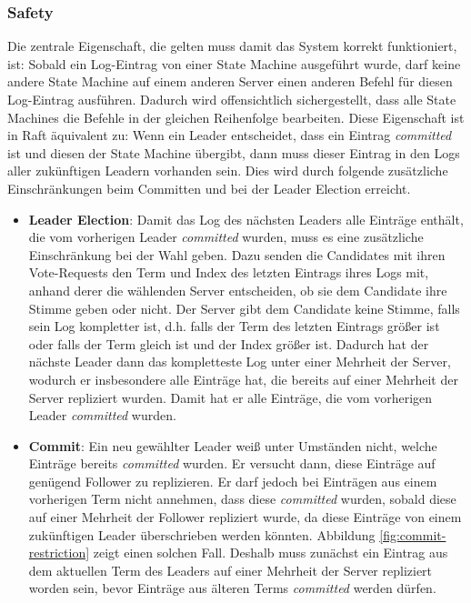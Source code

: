 \subsubsection{Safety}

Die zentrale Eigenschaft, die gelten muss damit das System korrekt funktioniert, ist: Sobald ein Log-Eintrag von einer State Machine ausgeführt wurde, darf keine andere State Machine auf einem anderen Server einen anderen Befehl für diesen Log-Eintrag ausführen. Dadurch wird offensichtlich sichergestellt, dass alle State Machines die Befehle in der gleichen Reihenfolge bearbeiten. Diese Eigenschaft ist in Raft äquivalent zu: Wenn ein Leader entscheidet, dass ein Eintrag \textit{committed} ist und diesen der State Machine übergibt, dann muss dieser Eintrag in den Logs aller zukünftigen Leadern vorhanden sein. Dies wird durch folgende zusätzliche Einschränkungen beim Committen und bei der Leader Election erreicht.

\begin{itemize}
	\item \textbf{Leader Election}: Damit das Log des nächsten Leaders alle Einträge enthält, die vom vorherigen Leader \textit{committed} wurden, muss es eine zusätzliche Einschränkung bei der Wahl geben. Dazu senden die Candidates mit ihren Vote-Requests den Term und Index des letzten Eintrags ihres Logs mit, anhand derer die wählenden Server entscheiden, ob sie dem Candidate ihre Stimme geben oder nicht. Der Server gibt dem Candidate keine Stimme, falls sein Log kompletter ist, d.h. falls der Term des letzten Eintrags größer ist oder falls der Term gleich ist und der Index größer ist. Dadurch hat der nächste Leader dann das \glqq{}kompletteste\grqq{} Log unter einer Mehrheit der Server, wodurch er insbesondere alle Einträge hat, die bereits auf einer Mehrheit der Server repliziert wurden. Damit hat er alle Einträge, die vom vorherigen Leader \textit{committed} wurden.
	\item \textbf{Commit}: Ein neu gewählter Leader weiß unter Umständen nicht, welche Einträge bereits \textit{committed} wurden. Er versucht dann, diese Einträge auf genügend Follower zu replizieren. Er darf jedoch bei Einträgen aus einem vorherigen Term nicht annehmen, dass diese \textit{committed} wurden, sobald diese auf einer Mehrheit der Follower repliziert wurde, da diese Einträge von einem zukünftigen Leader überschrieben werden könnten. Abbildung \ref{fig:commit-restriction} zeigt einen solchen Fall. Deshalb muss zunächst ein Eintrag aus dem aktuellen Term des Leaders auf einer Mehrheit der Server repliziert worden sein, bevor Einträge aus älteren Terms \textit{committed} werden dürfen.
\end{itemize}

